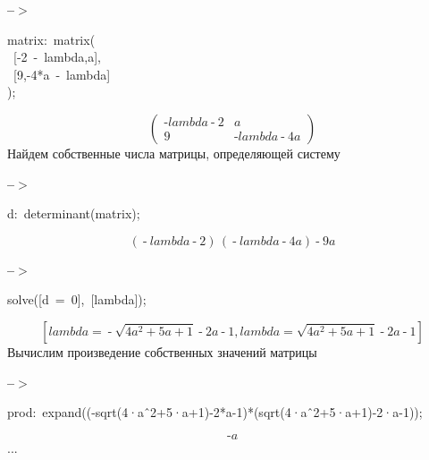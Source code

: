 \documentclass[fleqn]{article}
\begin{document}
\noindent
\begin{minipage}[t]{4.000000em}\color{red}\bfseries
 --\ensuremath{\ensuremath{>}}	
\end{minipage}
\begin{minipage}[t]{\textwidth}\color{blue}
matrix:\ matrix(\\
\ [-2\ -\ lambda,a],\ \\
\ [9,-4*a\ -\ lambda]\\
);\\

\end{minipage}
\[\displaystyle \tag{matrix} 
\begin{pmatrix}\operatorname{-}lambda\operatorname{-}2 & a\\
9 & \operatorname{-}lambda\operatorname{-}4 a\end{pmatrix}\mbox{}
\]
Найдем собственные числа матрицы, определяющей систему


\noindent
\begin{minipage}[t]{4.000000em}\color{red}\bfseries
 --\ensuremath{\ensuremath{>}}	
\end{minipage}
\begin{minipage}[t]{\textwidth}\color{blue}
d:\ determinant(matrix);
\end{minipage}
\[\displaystyle \tag{d} 
\left( \operatorname{-}lambda\operatorname{-}2\right) \, \left( \operatorname{-}lambda\operatorname{-}4 a\right) \operatorname{-}9 a\mbox{}
\]


\noindent
\begin{minipage}[t]{4.000000em}\color{red}\bfseries
 --\ensuremath{\ensuremath{>}}	
\end{minipage}
\begin{minipage}[t]{\textwidth}\color{blue}
solve([d\ =\ 0],\ [lambda]);
\end{minipage}
\[\displaystyle \tag{\% o39} 
\operatorname{[}lambda\operatorname{=}\operatorname{-}\sqrt{4 {{a}^{2}}\operatorname{+}5 a\operatorname{+}1}\operatorname{-}2 a\operatorname{-}1\operatorname{,}lambda\operatorname{=
}\sqrt{4 {{a}^{2}}\operatorname{+}5 a\operatorname{+}1}\operatorname{-}2 a\operatorname{-}1\operatorname{]}\mbox{}
\]
Вычислим произведение собственных значений матрицы


\noindent
\begin{minipage}[t]{4.000000em}\color{red}\bfseries
 --\ensuremath{\ensuremath{>}}	
\end{minipage}
\begin{minipage}[t]{\textwidth}\color{blue}
prod:\ expand((-sqrt(4·a\^\ 2+5·a+1)-2*a-1)*(sqrt(4·a\^\ 2+5·a+1)-2·a-1));
\end{minipage}
\[\displaystyle \tag{prod} 
\operatorname{-}a\mbox{}
\]
...
\end{document}
